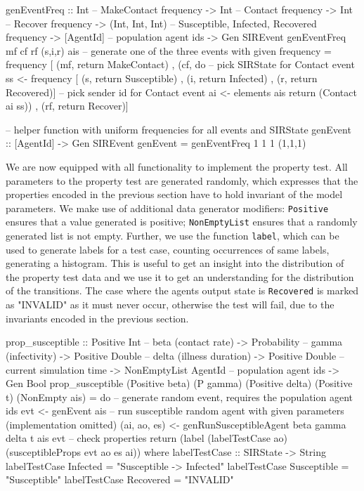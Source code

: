 \begin{HaskellCode}
genEventFreq :: Int             -- MakeContact frequency
             -> Int             -- Contact frequency
             -> Int             -- Recover frequency
             -> (Int, Int, Int) -- Susceptible, Infected, Recovered frequency
             -> [AgentId]       -- population agent ids
             -> Gen SIREvent
genEventFreq mf cf rf (s,i,r) ais
  -- generate one of the three events with given frequency
  = frequency [ (mf, return MakeContact)
              , (cf, do
                  -- pick SIRState for Contact event
                  ss <- frequency [ (s, return Susceptible)
                                  , (i, return Infected)
                                  , (r, return Recovered)]
                  -- pick sender id for Contact event
                  ai <- elements ais
                  return (Contact ai ss))
              , (rf, return Recover)]
         
-- helper function with uniform frequencies for all events and SIRState
genEvent :: [AgentId] -> Gen SIREvent
genEvent = genEventFreq 1 1 1 (1,1,1) 
\end{HaskellCode}

We are now equipped with all functionality to implement the property test. All parameters to the property test are generated randomly, which expresses that the properties encoded in the previous section have to hold invariant of the model parameters. We make use of additional data generator modifiers: \texttt{Positive} ensures that a value generated is positive; \texttt{NonEmptyList} ensures that a randomly generated list is not empty. Further, we use the function \texttt{label}, which can be used to generate labels for a test case, counting occurrences of same labels, generating a histogram. This is useful to get an insight into the distribution of the property test data and we use it to get an understanding for the distribution of the transitions. The case where the agents output state is \texttt{Recovered} is marked as "INVALID" as it must never occur, otherwise the test will fail, due to the invariants encoded in the previous section.

\begin{HaskellCode}
prop_susceptible :: Positive Int         -- beta (contact rate)
                 -> Probability          -- gamma (infectivity)
                 -> Positive Double      -- delta (illness duration)
                 -> Positive Double      -- current simulation time
                 -> NonEmptyList AgentId -- population agent ids
                 -> Gen Bool
prop_susceptible 
  (Positive beta) (P gamma) (Positive delta) (Positive t) (NonEmpty ais) = do
  -- generate random event, requires the population agent ids
  evt <- genEvent ais
  -- run susceptible random agent with given parameters (implementation omitted)
  (ai, ao, es) <- genRunSusceptibleAgent beta gamma delta t ais evt
  -- check properties
  return (label (labelTestCase ao) (susceptibleProps evt ao es ai))
  where
    labelTestCase :: SIRState -> String
    labelTestCase Infected    = "Susceptible -> Infected"
    labelTestCase Susceptible = "Susceptible"
    labelTestCase Recovered   = "INVALID"
\end{HaskellCode}

